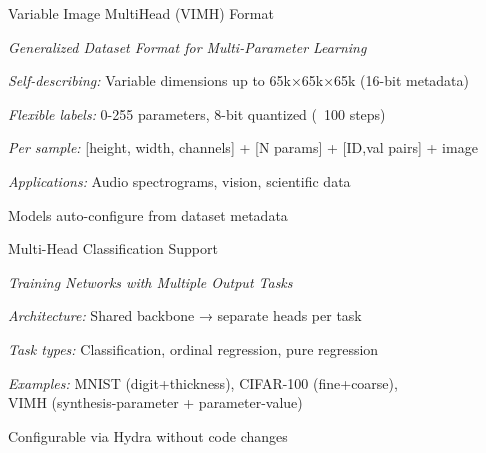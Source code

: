 \begin{slidewhite}[\slideopts,toc={VIMH}]{Variable Image MultiHead (VIMH) Format}
  \vspace{-2.5em}
  
  \vspace{-0.5em}
  \emph{Generalized Dataset Format for Multi-Parameter Learning}
  \vspace{-0.5em}
  
  \begin{itemize}
    \mpitem \emph{Self-describing:} Variable dimensions up to 65k×65k×65k (16-bit metadata)
    
    \mpitem \emph{Flexible labels:} 0-255 parameters, 8-bit quantized (~100 steps)
    
    \mpitem \emph{Per sample:} [height, width, channels] + [N params] + [ID,val pairs] + image
    
    \mpitem \emph{Applications:} Audio spectrograms, vision, scientific data
    
    \mpitem Models auto-configure from dataset metadata
  \end{itemize}
\end{slidewhite}
  


\begin{slide}[\slideopts,toc={MultiHead}]{Multi-Head Classification Support}

  \vspace{-1em}
  
  \scalebox{0.7}{
    
  }

  \emph{Training Networks with Multiple Output Tasks}
  
  \begin{itemize}
    \mpitem \emph{Architecture:} Shared backbone → separate heads per task
    
    \mpitem \emph{Task types:} Classification, ordinal regression, pure regression
    
    \mpitem \emph{Examples:} MNIST (digit+thickness), CIFAR-100 (fine+coarse),\\
    VIMH (synthesis-parameter + parameter-value)
    
    \mpitem Configurable via Hydra without code changes
  \end{itemize}
\end{slide}

